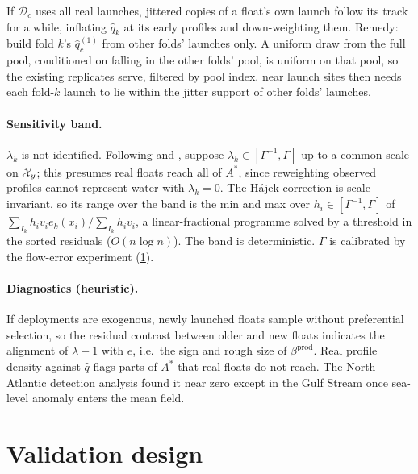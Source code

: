 \begin{remark}\label{rem:selfshare}
If $\mathcal D_c$ uses all real launches, jittered copies of a float's own launch follow its track for a
while, inflating $\hat q_k$ at its early profiles and down-weighting them. Remedy: build fold $k$'s
$\hat q^{(1)}_c$ from other folds' launches only. A uniform draw from the full pool, conditioned on
falling in the other folds' pool, is uniform on that pool, so the existing replicates serve, filtered by
pool index.  near launch sites then needs each fold-$k$ launch to lie within the jitter
support of other folds' launches.
\end{remark}

\paragraph{Sensitivity band.} $\lambda_k$ is not identified. Following \citet{tan2006} and
\citet{zhao2019}, suppose $\lambda_k\in[\Gamma^{-1},\Gamma]$ up to a common scale on $\mathcal{X}_y$; this presumes real floats
reach all of $A^*$, since reweighting observed profiles cannot represent water with $\lambda_k=0$. The Hájek
correction is scale-invariant, so its range over the band is the min and max over $h_i\in[\Gamma^{-1},\Gamma]$
of $\sum_{I_k}h_iv_ie_k(x_i)/\sum_{I_k}h_iv_i$, a linear-fractional programme solved by a threshold in
the sorted residuals ($O(n\log n)$). The band is deterministic. $\Gamma$ is
calibrated by the flow-error experiment (\cref{sec:validation}).

\paragraph{Diagnostics (heuristic).} If deployments are exogenous, newly launched floats sample without
preferential selection, so the residual contrast between older and new floats indicates the alignment of
$\lambda-1$ with $e$, i.e.\ the sign and rough size of $\beta^{\mathrm{prod}}$. Real profile density
against $\hat q$ flags parts of $A^*$ that real floats do not reach. The North Atlantic detection analysis found it near zero except in
the Gulf Stream once sea-level anomaly enters the mean field.

\section{Validation design}\label{sec:validation}

